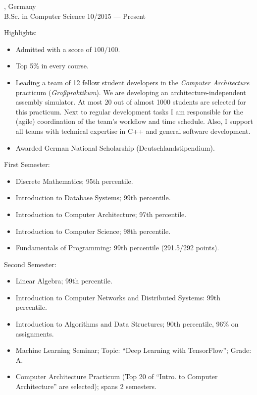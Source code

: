 \begin{entry}
	{, Germany}
	{\\B.Sc. in Computer Science}
	{10/2015 --- Present}
  \item Highlights:
  \begin{itemize}
    \item Admitted with a score of $100/100$.
    \item Top 5\% in every course.
    \item Leading a team of 12 fellow student developers in the \emph{Computer Architecture} practicum (\emph{Großpraktikum}). We are developing an architecture-independent assembly simulator. At most 20 out of almost 1000 students are selected for this practicum. Next to regular development tasks I am responsible for the (agile) coordination of the team's workflow and time schedule. Also, I support all teams with technical expertise in C++ and general software development.
    \item Awarded German National Scholarship (Deutschlandstipendium).
  \end{itemize}
  \item First Semester:
  \begin{itemize}
    \item Discrete Mathematics; 95th percentile.
    \item Introduction to Database Systems; 99th percentile.
    \item Introduction to Computer Architecture; 97th percentile.
    \item Introduction to Computer Science; 98th percentile.
    \item Fundamentals of Programming: 99th percentile (291.5/292 points).
  \end{itemize}
  \item Second Semester:
  \begin{itemize}
    \item Linear Algebra; 99th percentile.
    \item Introduction to Computer Networks and Distributed Systems: 99th percentile.
    \item Introduction to Algorithms and Data Structures; 90th percentile, 96\% on assignments.
    \item Machine Learning Seminar; Topic: ``Deep Learning with TensorFlow''; Grade: A.
    \item Computer Architecture Practicum (Top 20 of ``Intro. to Computer Architecture'' are selected); spans 2 semesters.
  \end{itemize}
\end{entry}

